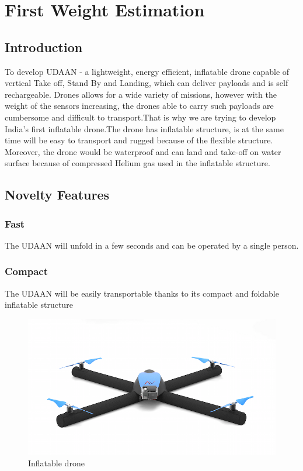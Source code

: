 \documentclass[8pt]{report}
\begin{document}
\tableofcontents{}
\let\cleardoublepage\relax
\thispagestyle{empty}

\listoffigures{}
\setcounter{page}{1}
\listoftables{}
\pagebreak
{}
\chapter{First Weight Estimation}
\section{Introduction}
To develop UDAAN - a lightweight, energy efficient, inflatable drone capable of vertical Take off, Stand By and Landing, which can deliver payloads and is self rechargeable.
Drones allows for a wide variety of missions, however with the weight of the sensors increasing, the drones able to carry such payloads are cumbersome and difficult to transport.That is why we are trying to develop India's first inflatable drone.The drone has inflatable structure, is at the same time will be easy to transport and rugged because of the flexible structure. Moreover, the drone would be waterproof and can land and take-off on water surface because of compressed Helium gas used in the inflatable structure. 


\section{Novelty Features}

\subsection{Fast}

The UDAAN will unfold in a few seconds and can be operated by a single person.

\subsection{Compact}

The UDAAN will be easily transportable thanks to its compact and foldable inflatable structure

\begin{figure}[h!]
\centering
\includegraphics[width=.8\textwidth]{drone.png} 
\caption{\label{fig:drone}Inflatable drone}
\end{figure}
\end{document}
